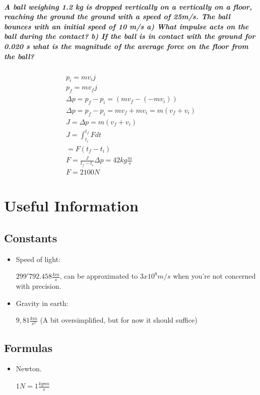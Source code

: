 \documentclass[11pt,fleqn]{book} %
\begin{document}
\paragraph{A ball weighing 1.2 kg is dropped vertically on a
vertically on a floor, reaching the ground
the ground with a speed of 25m/s. The ball
bounces with an initial speed of 10 m/s a)
What impulse acts on the ball during
the contact? b) If the ball is in contact
with the ground for 0.020 s what is the
magnitude of the average force on the
floor from the ball?}

\begin{gather}
    p_i = m v_i j\\
    p_f = m v_f j \\
    \Delta p = p_f - p_i = (m v_f - (-mv_i))\\
    \Delta p = p_f - p_i = mv_f + mv_i = m(v_f + v_i) \\
    J = \Delta p = m(v_f + v_i)\\
    J = \int_{t_i}^{t_f} F dt \\
    = F (t_f - t_i) \\
    F = \frac{J}{t_f - t_i} 
    \Delta p = 42 kg \frac{m}{s}\\
    F = 2100 N
\end{gather}

\chapter{Useful Information}

\section{Constants}
\begin{itemize}

    \item Speed of light: 
    
    $299'792.458 \frac{km}{s}$, can be approximated to $ 3x10^8 m/s $ when you're not concerned with precision.

    \item Gravity in earth: 
    
    $ 9,81 \frac{km}{s^2}$ (A bit oversimplified, but for now it should suffice)

\end{itemize}
\section{Formulas}
\begin{itemize}
    \item Newton.
    
    $ 1N = 1 \frac{kg \centerdot m}{s} $
\end{itemize}
\end{document}
